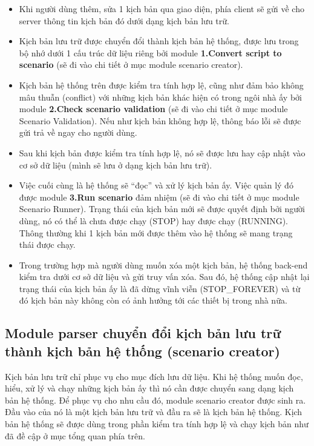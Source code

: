 \documentclass[12pt,a4paper,oneside]{extbook}
\begin{document}
	\begin{itemize}[topsep=1mm,itemsep=-0.5mm]
	\item Khi người dùng thêm, sửa 1 kịch bản qua giao diện, phía client sẽ gửi về cho server thông tin kịch bản đó dưới dạng kịch bản lưu trữ.
	\item Kịch bản lưu trữ được chuyển đổi thành kịch bản hệ thống, được lưu trong bộ nhớ dưới 1 cấu trúc dữ liệu riêng bởi module \textbf{1.Convert script to scenario} (sẽ đi vào chi tiết ở mục module scenario creator). 
	\item Kịch bản hệ thống trên được kiểm tra tính hợp lệ, cũng như đảm bảo không mâu thuẫn (conflict) với những kịch bản khác hiện có trong ngôi nhà ấy bởi module \textbf{2.Check scenario validation} (sẽ đi vào chi tiết ở mục module Scenario Validation). Nếu như kịch bản không hợp lệ, thông báo lỗi sẽ được gửi trả về ngay cho người dùng.
	\item Sau khi kịch bản được kiểm tra tính hợp lệ, nó sẽ được lưu hay cập nhật vào cơ sở dữ liệu (mình sẽ lưu ở dạng kịch bản lưu trữ). 
	\item Việc cuối cùng là hệ thống sẽ “đọc” và xử lý kịch bản ấy. Việc quản lý đó được module \textbf{3.Run scenario} đảm nhiệm (sẽ đi vào chi tiết ở mục module Scenario Runner). Trạng thái của kịch bản mới sẽ được quyết định bởi người dùng, nó có thể là chưa được chạy (STOP) hay được chạy (RUNNING). Thông thường khi 1 kịch bản mới được thêm vào hệ thống sẽ mang trạng thái được chạy.
	\item Trong trường hợp mà người dùng muốn xóa một kịch bản, hệ thống back-end kiểm tra dưới cơ sở dữ liệu và gửi truy vấn xóa. Sau đó, hệ thống cập nhật lại trạng thái của kịch bản ấy là đã dừng vĩnh viễn (STOP\_FOREVER) và từ đó kịch bản này không còn có ảnh hưởng tới các thiết bị trong nhà nữa. 
	\vspace{1mm}
	\end{itemize}
	
\subsection{Module parser chuyển đổi kịch bản lưu trữ thành kịch bản hệ thống (scenario creator)}\label{parser}

Kịch bản lưu trữ chỉ phục vụ cho mục đích lưu dữ liệu. Khi hệ thống muốn đọc, hiểu, xử lý và chạy những kịch bản ấy thì nó cần được chuyển sang dạng kịch bản hệ thống. Để phục vụ cho nhu cầu đó, module scenario creator được sinh ra. Đầu vào của nó là một kịch bản lưu trữ và đầu ra sẽ là kịch bản hệ thống. Kịch bản hệ thống sẽ được dùng trong phần kiểm tra tính hợp lệ và chạy kịch bản như đã đề cập ở mục tổng quan phía trên.\\
\end{document}
